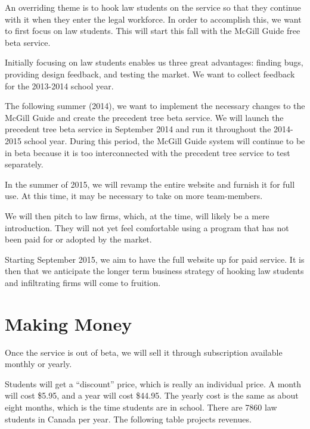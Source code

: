 \documentclass[11pt]{article}
\begin{document}
\break


An overriding theme is to hook law students on the service so that they continue with it when they enter the legal workforce. In order to accomplish this, we want to first focus on law students. This will start this fall with the McGill Guide free beta service.

Initially focusing on law students enables us three great advantages: finding bugs, providing design feedback, and testing the market. We want to collect feedback for the 2013-2014 school year.

The following summer (2014), we want to implement the necessary changes to the McGill Guide and create the precedent tree beta service. We will launch the precedent tree beta service in September 2014 and run it throughout the 2014-2015 school year. During this period, the McGill Guide system will continue to be in beta because it is too interconnected with the precedent tree service to test separately.

In the summer of 2015, we will revamp the entire website and furnish it for full use. At this time, it may be necessary to take on more team-members.

We will then pitch to law firms, which, at the time, will likely be a mere introduction. They will not yet feel comfortable using a program that has not been paid for or adopted by the market. 

Starting September 2015, we aim to have the full website up for paid service. It is then that we anticipate the longer term business strategy of hooking law students and infiltrating firms will come to fruition.


\section*{Making Money}

Once the service is out of beta, we will sell it through subscription available monthly or yearly. 

Students will get a ``discount'' price, which is really an individual price. A month will cost \$5.95, and a year will cost \$44.95. The yearly cost is the same as about eight months, which is the time students are in school. There are 7860 law students in Canada per year. The following table projects revenues.
\end{document}
